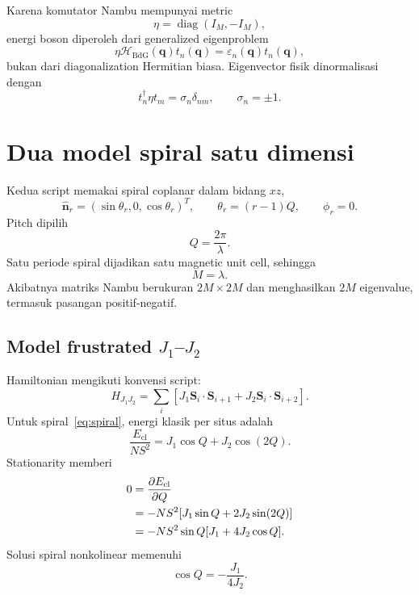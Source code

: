 \documentclass[11pt,a4paper]{article}
\newcommand{\vq}{\bm q}
\newcommand{\vS}{\bm S}
\newcommand{\vn}{\widehat{\bm n}}
\newcommand{\mH}{\mathcal H}
\begin{document}
Karena komutator Nambu mempunyai metric
\begin{equation}
\eta=\operatorname{diag}(I_M,-I_M),
\end{equation}
energi boson diperoleh dari generalized eigenproblem
\begin{equation}
\eta\mH_{\mathrm{BdG}}(\vq)t_n(\vq)
=\varepsilon_n(\vq)t_n(\vq),
\label{eq:bosonic-eig}
\end{equation}
bukan dari diagonalization Hermitian biasa. Eigenvector fisik dinormalisasi dengan
\begin{equation}
t_n^\dagger\eta t_m=\sigma_n\delta_{nm},
\qquad \sigma_n=\pm1.
\end{equation}

\section{Dua model spiral satu dimensi}

Kedua script memakai spiral coplanar dalam bidang $xz$,
\begin{equation}
\vn_r=(\sin\theta_r,0,\cos\theta_r)^T,
\qquad
\theta_r=(r-1)Q,
\qquad \phi_r=0.
\label{eq:spiral}
\end{equation}
Pitch dipilih
\begin{equation}
Q=\frac{2\pi}{\lambda}.
\end{equation}
Satu periode spiral dijadikan satu magnetic unit cell, sehingga
\begin{equation}
M=\lambda.
\end{equation}
Akibatnya matriks Nambu berukuran $2M\times2M$ dan menghasilkan $2M$ eigenvalue, termasuk pasangan positif-negatif.

\subsection{Model frustrated \texorpdfstring{$J_1$--$J_2$}{J1--J2}}

Hamiltonian mengikuti konvensi script:
\begin{equation}
H_{J_1J_2}
=\sum_i
\left[
J_1\vS_i\cdot\vS_{i+1}
+J_2\vS_i\cdot\vS_{i+2}
\right].
\label{eq:j1j2}
\end{equation}
Untuk spiral~\eqref{eq:spiral}, energi klasik per situs adalah
\begin{equation}
\frac{E_{\mathrm{cl}}}{NS^2}
=J_1\cos Q+J_2\cos(2Q).
\end{equation}
Stationarity memberi
\begin{align}
0&=\frac{\partial E_{\mathrm{cl}}}{\partial Q}\notag\\
&=-NS^2[J_1\sin Q+2J_2\sin(2Q)]\notag\\
&=-NS^2\sin Q[J_1+4J_2\cos Q].
\end{align}
Solusi spiral nonkolinear memenuhi
\begin{equation}
\boxed{\cos Q=-\frac{J_1}{4J_2}.}
\label{eq:j1j2pitch}
\end{equation}
\end{document}
